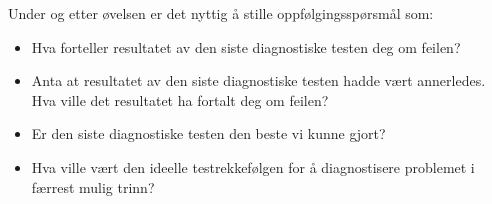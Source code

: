 Under og etter øvelsen er det nyttig å stille oppfølgingsspørsmål som:

\begin{itemize}
\item{} Hva forteller resultatet av den siste diagnostiske testen deg om feilen?
\item{} Anta at resultatet av den siste diagnostiske testen hadde vært annerledes. Hva ville det resultatet ha fortalt deg om feilen?
\item{} Er den siste diagnostiske testen den beste vi kunne gjort?
\item{} Hva ville vært den ideelle testrekkefølgen for å diagnostisere problemet i færrest mulig trinn?
\end{itemize}



